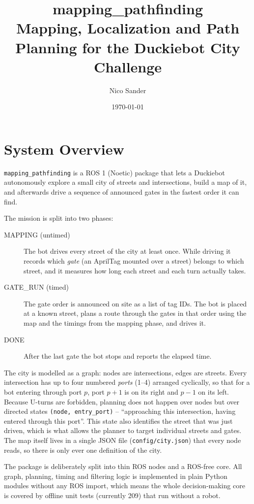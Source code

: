 \documentclass[10pt,a4paper]{article}
\title{\textbf{mapping\_pathfinding}\\[0.3em]
       \large Mapping, Localization and Path Planning for the Duckiebot City Challenge}
\author{Nico Sander}
\date{\today}
\begin{document}
\maketitle

\section{System Overview}

\texttt{mapping\_pathfinding} is a ROS 1 (Noetic) package that lets a Duckiebot
autonomously explore a small city of streets and intersections, build a map of
it, and afterwards drive a sequence of announced gates in the fastest order it
can find.

The mission is split into two phases:

\begin{description}
  \item[MAPPING (untimed)] The bot drives every street of the city at least
    once. While driving it records which \emph{gate} (an AprilTag mounted over
    a street) belongs to which street, and it measures how long each street and
    each turn actually takes.
  \item[GATE\_RUN (timed)] The gate order is announced on site as a list of tag
    IDs. The bot is placed at a known street, plans a route through the gates in
    that order using the map and the timings from the mapping phase, and drives
    it.
  \item[DONE] After the last gate the bot stops and reports the elapsed time.
\end{description}

The city is modelled as a graph: nodes are intersections, edges are streets.
Every intersection has up to four numbered \emph{ports} (1--4) arranged
cyclically, so that for a bot entering through port $p$, port $p+1$ is on its
right and $p-1$ on its left. Because U-turns are forbidden, planning does not
happen over nodes but over directed states \texttt{(node, entry\_port)} --
``approaching this intersection, having entered through this port''. This state
also identifies the street that was just driven, which is what allows the
planner to target individual streets and gates. The map itself lives in a single
JSON file (\texttt{config/city.json}) that every node reads, so there is only
ever one definition of the city.

The package is deliberately split into thin ROS nodes and a ROS-free core. All
graph, planning, timing and filtering logic is implemented in plain Python
modules without any ROS import, which means the whole decision-making core is
covered by offline unit tests (currently 209) that run without a robot.
\end{document}
